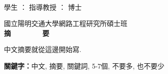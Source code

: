 
  \begin{center}
	\large
    \begin{singlespace}    
      \textbf{\chineseTitle{}} \\[0.5cm]
    \end{singlespace}
    
    \begin{singlespace}    

    	學生      ：\studentCnName{}  \hspace{2.5cm}  指導教授  ：\advisorCnName \hspace{0.1cm} 博士 \\
         [0.5cm]

    \end{singlespace}
    

    國立陽明交通大學網路工程研究所碩士班 \\[0.5cm]
    \textbf{摘~~~~~~~~要} \\[0.5cm]

  \end{center}
  \normalsize 
  中文摘要就從這邊開始寫.

  \vspace{1cm}

  \textbf{關鍵字：}中文, 摘要, 關鍵詞, 5-7個, 不要多, 也不要少
